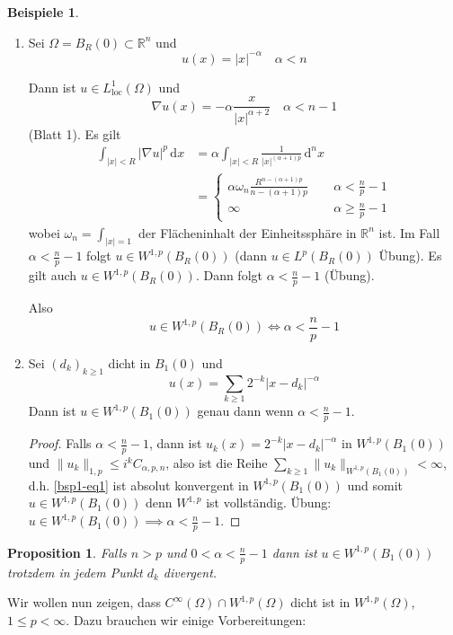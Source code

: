 \documentclass[
paper=a4,
bibtotocnumbered,
liststotocnumbered,
tablecaptionabove,
pointlessnumbers,
twoside,
openright,
10pt
]
{report}
\newtheorem{prop}[thm]{Proposition}
\theoremstyle{definition}
\newtheorem*{bspe}{Beispiele}
\numberwithin{equation}{chapter}
\begin{document}
\begin{bspe}
\begin{enumerate}[1)]
\item Sei $\Omega = B_R(0)\subset \mathbb R^n$ und $$u(x)=|x|^{-\alpha} \quad \alpha <n$$

Dann ist $u\in L_{\text{loc}}^1(\Omega)$ und 
$$\nabla u(x)= - \alpha \frac{x}{|x|^{\alpha+2}} \quad \alpha < n-1$$
(Blatt 1). Es gilt
\begin{align*}
\int_{|x|<R} |\nabla u|^p \, \mathrm dx &= \alpha \int_{|x|<R} \frac{1}{|x|^{(\alpha+1)p}} \, \mathrm d^n x\\
&= \begin{cases}
\alpha \omega_n \frac{R^{n-(\alpha+1)p}}{n-(\alpha+1)p} &\ \quad \alpha < \frac{n}{p} -1\\
\infty &\ \quad \alpha \ge \frac{n}{p} -1
\end{cases}
\end{align*}
wobei $\omega_n = \int_{|x|=1}$ der Flächeninhalt der Einheitssphäre in $\mathbb R^n$ ist. Im Fall $\alpha < \frac{n}{p}-1$ folgt $u\in W^{1,p}(B_R(0))$ (dann $u\in L^p(B_R(0))$ Übung). Es gilt auch $u\in W^{1,p}(B_R(0))$. Dann folgt $\alpha < \frac{n}{p}-1$ (Übung). 

Also
$$
u \in W^{1,p}(B_R(0)) \iff \alpha < \frac{n}{p}-1
$$
\item Sei $(d_k)_{k\ge 1}$ dicht in $B_1(0)$ und 
\begin{equation}\label{bsp1-eq1}
u(x) = \sum_{k\ge 1} 2^{-k} |x-d_k|^{-\alpha}
\end{equation}
Dann ist $u\in W^{1,p}(B_1(0))$ genau dann wenn $\alpha < \frac{n}{p}-1$.
\begin{proof}
Falls $\alpha < \frac{n}{p}-1$, dann ist $u_k(x)=2^{-k} |x-d_k|^{-\alpha}$ in $W^{1,p}(B_1(0))$ und $\| u_k\|_{1,p} \le i^k C_{\alpha, p,n}$, also ist die Reihe $\sum_{k\ge 1} \| u_k \|_{W^{1,p}(B_1(0))} < \infty$, d.h. \eqref{bsp1-eq1} ist absolut konvergent in $W^{1,p}(B_1(0))$ und somit $u\in W^{1,p}(B_1(0))$ denn $W^{1,p}$ ist vollständig. Übung: $u\in W^{1,p}(B_1(0))\implies \alpha < \frac{n}{p}-1$. 
\end{proof}
\end{enumerate}
\end{bspe}

\begin{prop}
Falls $n>p$ und $0<\alpha < \frac{n}{p}-1$ dann ist $u\in W^{1,p}(B_1(0))$ trotzdem in jedem Punkt $d_k$ divergent.
\end{prop}
Wir wollen nun zeigen, dass $C^\infty(\Omega) \cap W^{1,p}(\Omega)$ dicht ist in $W^{1,p}(\Omega)$, $1\le p <\infty$. Dazu brauchen wir einige Vorbereitungen:
\end{document}
